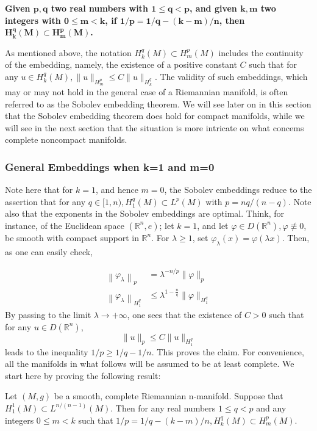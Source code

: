 \documentclass[12pt,hyperref,a4paper,UTF8]{ctexart}
\begin{document}
\vskip 5pt
\noindent
\textbf{Given $\bm{p, q}$ two real numbers with $\bm{1 \leq q<p}$, and given $\bm{k, m}$ two integers with $\bm{0 \leq m<k}$, if $\bm{1 / p=1 / q-(k-m) / n}$, then $\bm{H_k^q(M) \subset H_m^p(M)}$.}

\vskip 5pt
\noindent
As mentioned above, the notation $H_k^q(M) \subset H_m^p(M)$ includes the continuity of the embedding, namely, the existence of a positive constant $C$ such that for any $u \in H_k^q(M),\|u\|_{H_m^p} \leq C\|u\|_{H_k^q}$. The validity of such embeddings, which may or may not hold in the general case of a Riemannian manifold, is often referred to as the Sobolev embedding theorem. We will see later on in this section that the Sobolev embedding theorem does hold for compact manifolds, while we will see in the next section that the situation is more intricate on what concems complete noncompact manifolds. 

\subsubsection{General Embeddings when k=1 and m=0}
Note here that for $k=1$, and hence $m=0$, the Sobolev embeddings reduce to the assertion that for any $q \in[1, n), H_1^q(M) \subset L^p(M)$ with $p=n q /(n-q)$. Note also that the exponents in the Sobolev embeddings are optimal. Think, for instance, of the Euclidean space $\left(\mathbb{R}^n, e\right)$; let $k=1$, and let $\varphi \in D\left(\mathbb{R}^n\right), \varphi \not\equiv 0$, be smooth with compact support in $\mathbb{R}^n$. For $\lambda \geq 1$, set $\varphi_\lambda(x)=\varphi(\lambda x)$. Then, as one can easily check,

$$
\begin{aligned}
\left\|\varphi_\lambda\right\|_p & =\lambda^{-n / p}\|\varphi\|_p \\
\left\|\varphi_\lambda\right\|_{H_1^q} & \leq \lambda^{1-\frac{n}{q}}\|\varphi\|_{H_1^q}
\end{aligned}
$$
By passing to the limit $\lambda \rightarrow+\infty$, one sees that the existence of $C>0$ such that for any $u \in D\left(\mathbb{R}^n\right)$,
$$
\|u\|_p \leq C\|u\|_{H_1^q}
$$
leads to the inequality $1 / p \geq 1 / q-1 / n$. This proves the claim. For convenience, all the manifolds in what follows will be assumed to be at least complete. We start here by proving the following result:

\begin{Lemma}
    Let $(M, g)$ be a smooth, complete Riemannian n-manifold. Suppose that $H_1^{1}(M) \subset L^{n /(n-1)}(M)$. Then for any real numbers $1 \leq q<p$ and any integers $0 \leq m<k$ such that $1 / p=1 / q-(k-m) / n, H_k^q(M) \subset H_m^p(M)$.
\label{lem31}
\end{Lemma}
\end{document}
